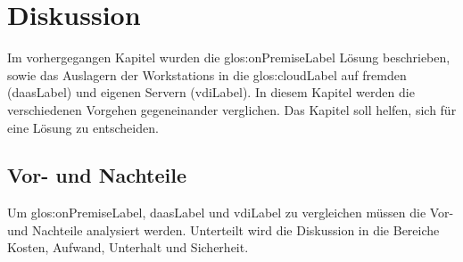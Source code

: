 
\chapter{Diskussion}
Im vorhergegangen Kapitel wurden die \gls{glos:onPremiseLabel} Lösung beschrieben, sowie das Auslagern der Workstations in die \Gls{glos:cloudLabel} auf fremden (\Gls{daasLabel}) und eigenen Servern (\Gls{vdiLabel}). In diesem Kapitel werden die verschiedenen Vorgehen gegeneinander verglichen. Das Kapitel soll helfen, sich für eine Lösung zu entscheiden.


\section{Vor- und Nachteile}




Um \gls{glos:onPremiseLabel}, \Gls{daasLabel} und \Gls{vdiLabel} zu vergleichen müssen die Vor- und Nachteile analysiert werden.
Unterteilt wird die Diskussion in die Bereiche Kosten, Aufwand, Unterhalt und Sicherheit.

